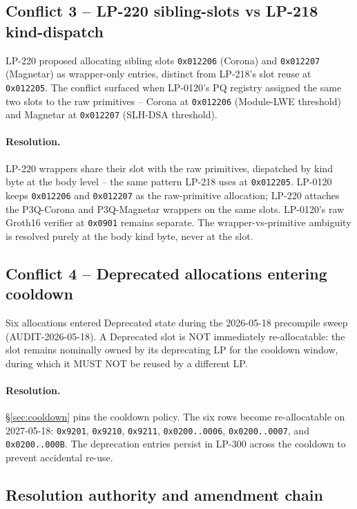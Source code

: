 \subsection{Conflict 3 -- LP-220 sibling-slots vs LP-218 kind-dispatch}

LP-220 proposed allocating sibling slots \texttt{0x012206} (Corona)
and \texttt{0x012207} (Magnetar) as wrapper-only entries, distinct
from LP-218's slot reuse at \texttt{0x012205}. The conflict surfaced
when LP-0120's PQ registry assigned the same two slots to the raw
primitives -- Corona at \texttt{0x012206} (Module-LWE threshold) and
Magnetar at \texttt{0x012207} (SLH-DSA threshold).

\paragraph{Resolution.} LP-220 wrappers share their slot with the
raw primitives, dispatched by kind byte at the body level -- the
same pattern LP-218 uses at \texttt{0x012205}. LP-0120 keeps
\texttt{0x012206} and \texttt{0x012207} as the raw-primitive
allocation; LP-220 attaches the P3Q-Corona and P3Q-Magnetar wrappers
on the same slots. LP-0120's raw Groth16 verifier at \texttt{0x0901}
remains separate. The wrapper-vs-primitive ambiguity is resolved
purely at the body kind byte, never at the slot.

\subsection{Conflict 4 -- Deprecated allocations entering cooldown}

Six allocations entered Deprecated state during the 2026-05-18
precompile sweep (AUDIT-2026-05-18). A Deprecated slot is NOT
immediately re-allocatable: the slot remains nominally owned by its
deprecating LP for the cooldown window, during which it MUST NOT
be reused by a different LP.

\paragraph{Resolution.} \S\ref{sec:cooldown} pins the cooldown
policy. The six rows become re-allocatable on 2027-05-18:
\texttt{0x9201}, \texttt{0x9210}, \texttt{0x9211},
\texttt{0x0200..0006}, \texttt{0x0200..0007}, and \texttt{0x0200..000B}.
The deprecation entries persist in LP-300 across the cooldown to
prevent accidental re-use.

\subsection{Resolution authority and amendment chain}

